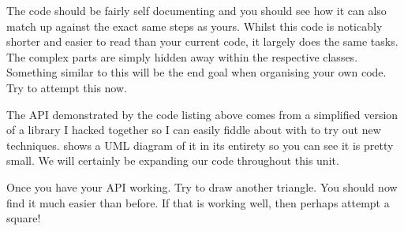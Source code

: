 \documentclass[10pt]{article}
\begin{document}
The code should be fairly self documenting and you should see how it
can also match up against the exact same steps as yours. Whilst this
code is noticably shorter and easier to read than your current code,
it largely does the same tasks. The complex parts are simply hidden
away within the respective classes. Something similar to this will be
the end goal when organising your own code. Try to attempt this now.


The API demonstrated by the code listing above comes from a simplified
version of a library I hacked together so I can easily fiddle about with
 to try out new techniques.  shows a UML diagram of
it in its entirety so you can see it is pretty small. We will certainly
be expanding our code throughout this unit.





Once you have your API working. Try to draw another triangle. You should now find it much easier than before.
If that is working well, then perhaps attempt a square!
\end{document}
